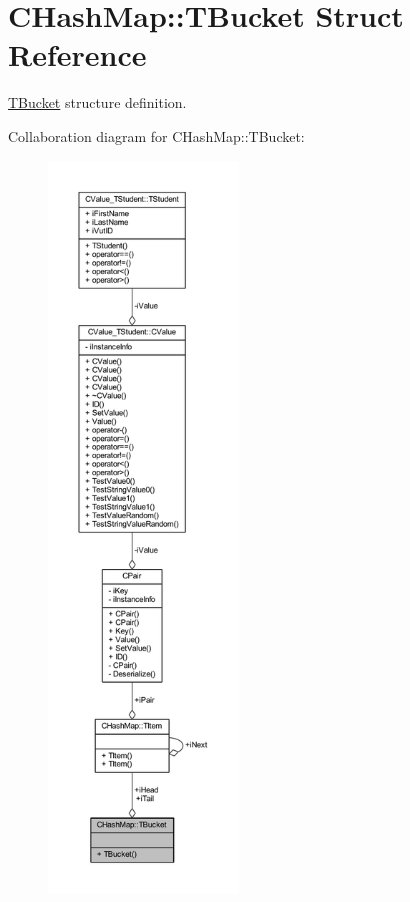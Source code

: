 \hypertarget{struct_c_hash_map_1_1_t_bucket}{}\section{C\+Hash\+Map\+:\+:T\+Bucket Struct Reference}
\label{struct_c_hash_map_1_1_t_bucket}


\hyperlink{struct_c_hash_map_1_1_t_bucket}{T\+Bucket} structure definition.  




Collaboration diagram for C\+Hash\+Map\+:\+:T\+Bucket\+:\nopagebreak
\begin{figure}[H]
\begin{center}
\leavevmode
\includegraphics[height=550pt]{struct_c_hash_map_1_1_t_bucket__coll__graph}
\end{center}
\end{figure}
